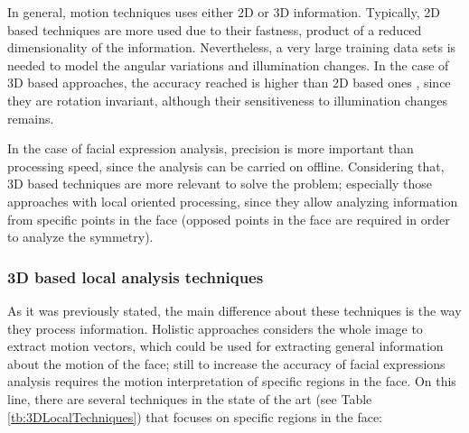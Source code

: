 In general, motion techniques uses either 2D or 3D information. Typically, 2D based techniques are more used due to their fastness, product of a reduced dimensionality of the information. Nevertheless,  a very large training data sets is needed to model the angular variations and illumination changes. In the case of 3D based approaches, the accuracy reached is higher than 2D based ones \cite{Fang2012}, since they are rotation invariant, although their sensitiveness to illumination changes remains.

In the case of facial expression analysis, precision is more important than processing speed, since the analysis can be carried on offline. Considering that, 3D based techniques are more relevant to solve the problem; especially those approaches with local oriented processing, since they allow analyzing information from specific points in the face (opposed points in the face are required in order to analyze the symmetry).

\subsubsection{3D based local analysis techniques}
As it was previously stated, the main difference about these techniques is the way they process information. Holistic approaches considers the whole image to extract motion vectors, which could be used for extracting general information about the motion of the face; still to increase the accuracy of facial expressions analysis requires the motion interpretation of specific regions in the face. On this line, there are several techniques in the state of the art (see Table \ref{tb:3DLocalTechniques}) that focuses on specific regions in the face:

